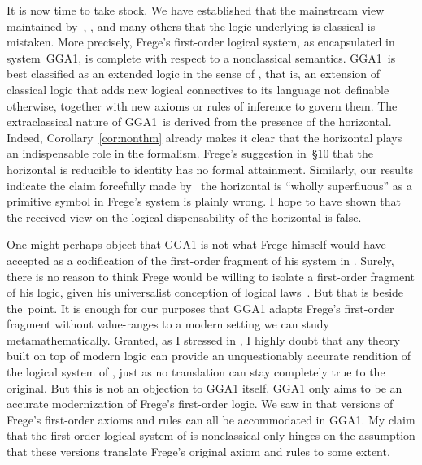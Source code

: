 \documentclass{preprint}
\newcommand{\GGA}{\textsf{GGA1}}
\begin{document}
It is now time to take stock. 
We have established that the mainstream view maintained by~\cite{parsons1987consistency}, \cite{heck1996consistency}, \cite{burgess1998consistent} and many others that the logic underlying {\gga} is classical is mistaken. 
More precisely, Frege's first-order logical system, as encapsulated in system~\GGA, is complete with respect to a nonclassical semantics. \GGA~is best classified as an extended logic in the sense of \citet[pp.~4--5]{haack1978philosophy}, that is, an extension of classical logic that adds new logical
connectives to its language not definable otherwise, together with new axioms or rules of inference to
govern them. 
The extraclassical nature of \GGA~is derived from the presence of the horizontal. 
Indeed, Corollary~\ref{cor:nonthm} already makes it clear that the horizontal plays an indispensable role in the formalism. 
Frege's suggestion in~\S10 that the horizontal is reducible to identity has no formal attainment. Similarly, our results indicate the claim forcefully made by~\citet[p.~315]{dummett1973fregelanguage} the horizontal is ``wholly superfluous'' as a primitive symbol in Frege's system is plainly wrong. 
I hope to have shown that the received view on the logical dispensability of the horizontal is false. 

One might perhaps object that {\GGA} is not what Frege himself would have accepted as a codification of the first-order fragment of his system in \gga. Surely, there is no reason to think Frege would be willing to isolate a first-order fragment of his logic, given his universalist conception of logical laws~\citep{goldfarb2001frege}. But that is beside the~point. It is enough for our purposes that {\GGA} adapts Frege's first-order fragment without value-ranges to a modern setting we can study metamathematically. 
Granted, as I stressed in , I highly doubt that any theory built on top of modern logic can provide an unquestionably accurate rendition of the logical system of \gga, just as no translation can stay completely true to the original. 
But this is not an objection to {\GGA} itself. 
{\GGA} only aims to be an accurate modernization of Frege's first-order logic. We saw in  that versions of Frege's first-order axioms and rules can all be accommodated in \GGA. My claim that the first-order logical system of {\gga} is nonclassical only hinges on the assumption that these versions translate Frege's original axiom and rules to some extent. 
\end{document}
